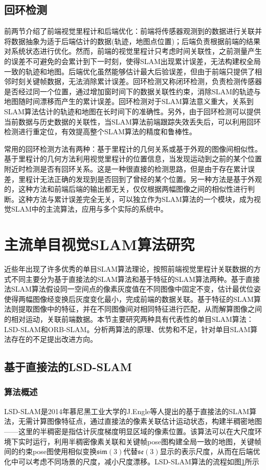 \subsection{回环检测}
前两节介绍了前端视觉里程计和后端优化：前端将传感器观测到的数据进行关联并将数据抽象为适于后端估计的数据(轨迹，地图点位置)；后端负责根据前端的结果对系统状态进行优化。然而，前端的视觉里程计只考虑时间关联性，之前测量产生的误差不可避免的会累计到下一时刻，使得SLAM出现累计误差，无法构建权全局一致的轨迹和地图。后端优化虽然能够估计最大后验误差，但由于前端只提供了相邻时刻关键帧数据，无法消除累计误差。回环检测又称闭环检测，负责检测传感器是否经过同一个位置，通过增加窗时间下的数据关联性约束，消除SLAM的轨迹与地图随时间漂移而产生的累计误差。回环检测对于SLAM算法意义重大，关系到SLAM算法估计的轨迹和地图在长时间下的准确性。另外，由于回环检测可以提供当前数据与历史数据的关联性，当SLAM算法前端跟踪失效丢失后，可以利用回环检测进行重定位，有效提高整个SLAM算法的精度和鲁棒性。

常用的回环检测方法有两种：基于里程计的几何关系或基于外观的图像间相似性。基于里程计的几何方法利用视觉里程计的位置信息，当发现运动到之前的某个位置附近时检测是否有回环关系。这是一种很直接的检测思路，但是由于存在累计误差，里程计无法正确的发现到是否回到了曾经的某个位置。另一种方法是基于外观的，这种方法和前端后端的输出都无关，仅仅根据两幅图像之间的相似性进行判断。这种方法与累计误差完全无关，可以独立作为SLAM算法的一个模块，成为视觉SLAM中的主流算法，应用与多个实际的系统中。


\section{主流单目视觉SLAM算法研究}
近些年出现了许多优秀的单目SLAM算法理论，按照前端视觉里程计关联数据的方式不同主要分为基于直接法的SLAM算法和基于特征的SLAM算法两种。基于直接法SLAM算法假设同一空间点的像素灰度值在不同图像中固定不变，估计最优位姿使得两幅图像经变换后灰度变化最小，完成前端的数据关联。基于特征的SLAM算法则提取图像中的特征，并在不同图像间对相同特征进行匹配，从而解算图像之间的相对运动，关联前端数据。本节主要研究两种具有代表性的单目SLAM算法：LSD-SLAM和ORB-SLAM。分析两算法的原理、优势和不足，针对单目SLAM算法存在的不足提出改进方向。

\subsection{基于直接法的LSD-SLAM}


\subsubsection*{算法概述}
LSD-SLAM是2014年慕尼黑工业大学的J.Engle等人提出的基于直接法的SLAM算法，无需计算图像特征点，通过直接法的像素关联估计运动状态，构建半稠密地图——这里的半稠密是指估计灰度梯度明显区域的像素位置。该算法可以在大尺度环境下实时运行，利用半稠密像素关联和关键帧pose图构建全局一致的地图，关键帧间的约束pose图使用相似变换$\mathfrak{sim}(3)$代替$\mathfrak{se}(3)$显示的表示尺度，从而在后端优化中可以考虑不同场景的尺度，减小尺度漂移。LSD-SLAM算法的流程如图\ref{fig3.4}所示
\begin{figure}
\label{fig3.4} %

\end{figure}

